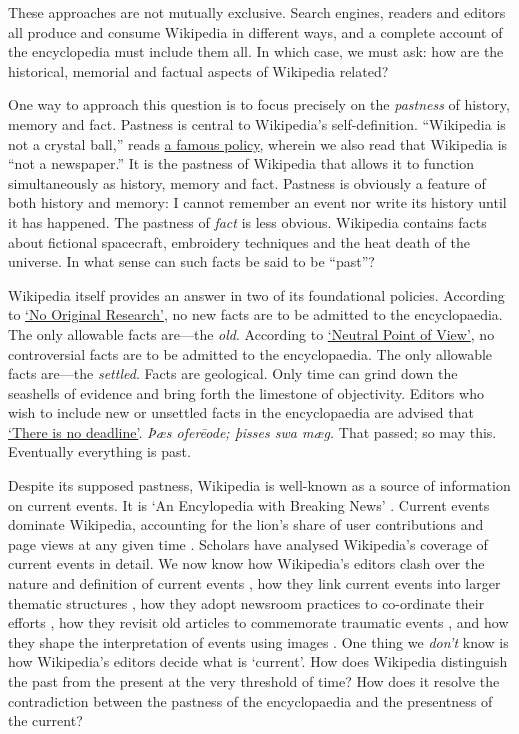 \documentclass[Royal,times,sageh]{sagej}
\begin{document}
These approaches are not mutually exclusive. Search engines, readers and
editors all produce and consume Wikipedia in different ways, and a
complete account of the encyclopedia must include them all. In which
case, we must ask: how are the historical, memorial and factual aspects
of Wikipedia related?

One way to approach this question is to focus precisely on the
\emph{pastness} of history, memory and fact. Pastness is central to
Wikipedia's self-definition. ``Wikipedia is not a crystal ball,'' reads
\href{https://en.wikipedia.org/wiki/WP:NOT}{a famous policy}, wherein we
also read that Wikipedia is ``not a newspaper.'' It is the pastness of
Wikipedia that allows it to function simultaneously as history, memory
and fact. Pastness is obviously a feature of both history and memory: I
cannot remember an event nor write its history until it has happened.
The pastness of \emph{fact} is less obvious. Wikipedia contains facts
about fictional spacecraft, embroidery techniques and the heat death of
the universe. In what sense can such facts be said to be ``past''?

Wikipedia itself provides an answer in two of its foundational policies.
According to
\href{https://en.wikipedia.org/wiki/Wikipedia:No_original_research}{`No
Original Research'}, no new facts are to be admitted to the
encyclopaedia. The only allowable facts are---the \emph{old}. According
to
\href{https://en.wikipedia.org/wiki/Wikipedia:Neutral_point_of_view}{`Neutral
Point of View'}, no controversial facts are to be admitted to the
encyclopaedia. The only allowable facts are---the \emph{settled}. Facts
are geological. Only time can grind down the seashells of evidence and
bring forth the limestone of objectivity. Editors who wish to include
new or unsettled facts in the encyclopaedia are advised that
\href{https://en.wikipedia.org/wiki/Wikipedia:There_is_no_deadline}{`There
is no deadline'}. \emph{Þæs oferēode; þisses swa mæg.} That passed; so
may this. Eventually everything is past.

Despite its supposed pastness, Wikipedia is well-known as a source of
information on current events. It is `An Encylopedia with Breaking News'
\citep{keegan_encyclopedia_2019}. Current events dominate Wikipedia,
accounting for the lion's share of user contributions and page views at
any given time \citep{keegan_hot_2011}. Scholars have analysed
Wikipedia's coverage of current events in detail. We now know how
Wikipedia's editors clash over the nature and definition of current
events \citep{ford_writing_2022, pentzold_fixing_2009}, how they link
current events into larger thematic structures
\citep{twyman_black_2017}, how they adopt newsroom practices to
co-ordinate their efforts \citep{avieson_breaking_2019}, how they
revisit old articles to commemorate traumatic events
\citep{ferron_beyond_2014}, and how they shape the interpretation of
events using images \citep{porter_visual_2020}. One thing we
\emph{don't} know is how Wikipedia's editors decide what is `current'.
How does Wikipedia distinguish the past from the present at the very
threshold of time? How does it resolve the contradiction between the
pastness of the encyclopaedia and the presentness of the current?
\end{document}
